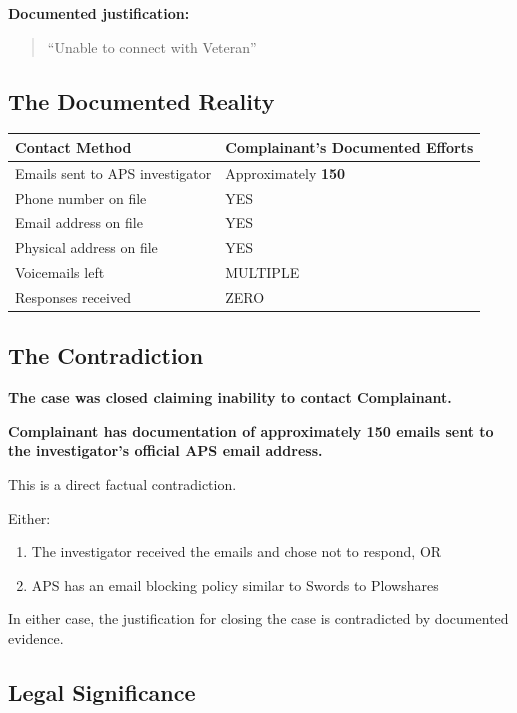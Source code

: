 \documentclass[12pt,letterpaper]{article}
\begin{document}
\textbf{Documented justification:}
\begin{quote}
``Unable to connect with Veteran''
\end{quote}

\subsection{The Documented Reality}

\begin{center}
\begin{tabular}{ll}
\toprule
\textbf{Contact Method} & \textbf{Complainant's Documented Efforts} \\
\midrule
Emails sent to APS investigator & Approximately \textbf{150} \\
Phone number on file & YES \\
Email address on file & YES \\
Physical address on file & YES \\
Voicemails left & MULTIPLE \\
Responses received & ZERO \\
\bottomrule
\end{tabular}
\end{center}

\subsection{The Contradiction}

\textbf{The case was closed claiming inability to contact Complainant.}

\textbf{Complainant has documentation of approximately 150 emails sent to the investigator's official APS email address.}

This is a direct factual contradiction.

Either:
\begin{enumerate}[noitemsep]
    \item The investigator received the emails and chose not to respond, OR
    \item APS has an email blocking policy similar to Swords to Plowshares
\end{enumerate}

In either case, the justification for closing the case is contradicted by documented evidence.

\subsection{Legal Significance}
\end{document}
